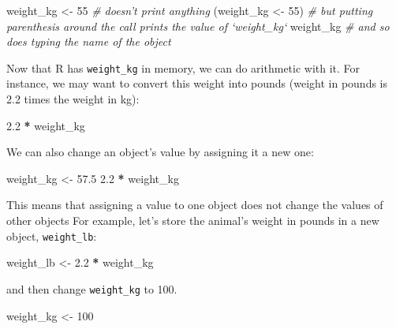 \documentclass[]{book}
\newenvironment{Shaded}{\begin{snugshade}}{\end{snugshade}}
\newcommand{\DecValTok}[1]{\textcolor[rgb]{0.00,0.00,0.81}{#1}}
\newcommand{\FloatTok}[1]{\textcolor[rgb]{0.00,0.00,0.81}{#1}}
\newcommand{\StringTok}[1]{\textcolor[rgb]{0.31,0.60,0.02}{#1}}
\newcommand{\CommentTok}[1]{\textcolor[rgb]{0.56,0.35,0.01}{\textit{#1}}}
\newcommand{\OperatorTok}[1]{\textcolor[rgb]{0.81,0.36,0.00}{\textbf{#1}}}
\newcommand{\NormalTok}[1]{#1}
\begin{document}
\begin{Shaded}
\begin{Highlighting}[]
\NormalTok{weight_kg <-}\StringTok{ }\DecValTok{55}    \CommentTok{# doesn't print anything}
\NormalTok{(weight_kg <-}\StringTok{ }\DecValTok{55}\NormalTok{)  }\CommentTok{# but putting parenthesis around the call prints the value of `weight_kg`}
\NormalTok{weight_kg          }\CommentTok{# and so does typing the name of the object}
\end{Highlighting}
\end{Shaded}

Now that R has \texttt{weight\_kg} in memory, we can do arithmetic with
it. For instance, we may want to convert this weight into pounds (weight
in pounds is 2.2 times the weight in kg):

\begin{Shaded}
\begin{Highlighting}[]
\FloatTok{2.2} \OperatorTok{*}\StringTok{ }\NormalTok{weight_kg}
\end{Highlighting}
\end{Shaded}

We can also change an object's value by assigning it a new one:

\begin{Shaded}
\begin{Highlighting}[]
\NormalTok{weight_kg <-}\StringTok{ }\FloatTok{57.5}
\FloatTok{2.2} \OperatorTok{*}\StringTok{ }\NormalTok{weight_kg}
\end{Highlighting}
\end{Shaded}

This means that assigning a value to one object does not change the
values of other objects For example, let's store the animal's weight in
pounds in a new object, \texttt{weight\_lb}:

\begin{Shaded}
\begin{Highlighting}[]
\NormalTok{weight_lb <-}\StringTok{ }\FloatTok{2.2} \OperatorTok{*}\StringTok{ }\NormalTok{weight_kg}
\end{Highlighting}
\end{Shaded}

and then change \texttt{weight\_kg} to 100.

\begin{Shaded}
\begin{Highlighting}[]
\NormalTok{weight_kg <-}\StringTok{ }\DecValTok{100}
\end{Highlighting}
\end{Shaded}
\end{document}
